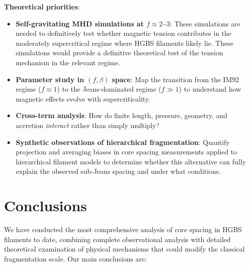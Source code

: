 \documentclass[11pt,a4paper]{article}
\begin{document}
\textbf{Theoretical priorities}:
\begin{itemize}
    \item \textbf{Self-gravitating MHD simulations at $f \approx 2$--$3$}: These simulations are needed to definitively test whether magnetic tension contributes in the moderately supercritical regime where HGBS filaments likely lie. These simulations would provide a definitive theoretical test of the tension mechanism in the relevant regime.
    \item \textbf{Parameter study in $(f, \beta)$ space}: Map the transition from the IM92 regime ($f \approx 1$) to the Jeans-dominated regime ($f \gg 1$) to understand how magnetic effects evolve with supercriticality.
    \item \textbf{Cross-term analysis}: How do finite length, pressure, geometry, and accretion \textit{interact} rather than simply multiply?
    \item \textbf{Synthetic observations of hierarchical fragmentation}: Quantify projection and averaging biases in core spacing measurements applied to hierarchical filament models to determine whether this alternative can fully explain the observed sub-Jeans spacing and under what conditions.
\end{itemize}

\section{Conclusions}
\label{sec:conclusions}

We have conducted the most comprehensive analysis of core spacing in HGBS filaments to date, combining complete observational analysis with detailed theoretical examination of physical mechanisms that could modify the classical fragmentation scale. Our main conclusions are:
\end{document}
